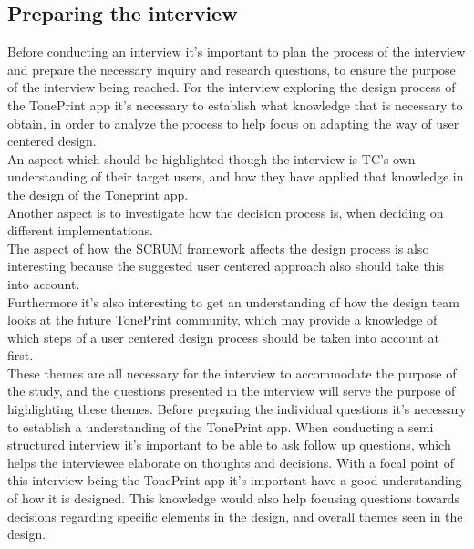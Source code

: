 \subsection{Preparing the interview}
\label{PreparingTheInterview}
%
Before conducting an interview it's important to plan the process of the interview and prepare the necessary inquiry and research questions, to ensure the purpose of the interview being reached. For the interview exploring the design process of the TonePrint app it's necessary to establish what knowledge that is necessary to obtain, in order to analyze the process to help focus on adapting the way of user centered design.\\
An aspect which should be highlighted though the interview is TC's own understanding of their target users, and how they have applied that knowledge in the design of the Toneprint app.\\
Another aspect is to investigate how the decision process is, when deciding on different implementations.\\
The aspect of how the SCRUM framework affects the design process is also interesting because the suggested user centered approach also should take this into account.\\
Furthermore it's also interesting to get an understanding of how the design team looks at the future TonePrint community, which may provide a knowledge of which steps of a user centered design process should be taken into account at first.\\
These themes are all necessary for the interview to accommodate the purpose of the study, and the questions presented in the interview will serve the purpose of highlighting these themes. Before preparing the individual questions it's necessary to establish a understanding of the TonePrint app. When conducting a semi structured interview it's important to be able to ask follow up questions, which helps the interviewee elaborate on thoughts and decisions. With a focal point of this interview being the TonePrint app it's important have a good understanding of how it is designed. This knowledge would also help focusing questions towards decisions regarding specific elements in the design, and overall themes seen in the design.

